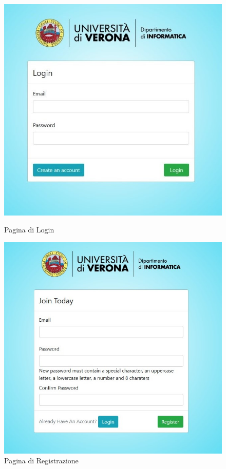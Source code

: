 \begin{figure}[htp]
\begin{minipage}[b]{0.5\linewidth}
	\centering
	\includegraphics[width=\linewidth]{images/chapter4-flask-login.jpg}
	\caption{Pagina di Login}
\end{minipage}
\begin{minipage}[b]{0.5\linewidth}
	\centering
	\includegraphics[width=\linewidth]{images/chapter4-flask-register.jpg}
	\caption{Pagina di Registrazione}
\end{minipage}
\hspace{0.5cm}
\end{figure}

